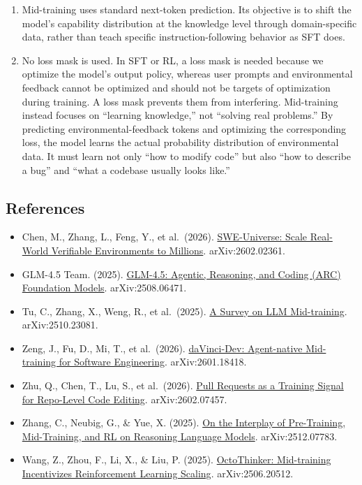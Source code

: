 \begin{enumerate}
\def\labelenumi{\arabic{enumi}.}
\item
  Mid-training uses standard next-token prediction. Its objective is to shift the model's capability distribution at the knowledge level through domain-specific data, rather than teach specific instruction-following behavior as SFT does.
\item
  No loss mask is used. In SFT or RL, a loss mask is needed because we optimize the model's output policy, whereas user prompts and environmental feedback cannot be optimized and should not be targets of optimization during training. A loss mask prevents them from interfering. Mid-training instead focuses on ``learning knowledge,'' not ``solving real problems.'' By predicting environmental-feedback tokens and optimizing the corresponding loss, the model learns the actual probability distribution of environmental data. It must learn not only ``how to modify code'' but also ``how to describe a bug'' and ``what a codebase usually looks like.''
\end{enumerate}

\FloatBarrier
{}
\hypertarget{references-117}{%
\subsection{References}\label{references-117}}

\vspace{0.25em}
\begin{itemize}
\tightlist
\item
  Chen, M., Zhang, L., Feng, Y., et al.~(2026). \href{https://arxiv.org/abs/2602.02361}{SWE-Universe: Scale Real-World Verifiable Environments to Millions}. arXiv:2602.02361.
\item
  GLM-4.5 Team. (2025). \href{https://arxiv.org/abs/2508.06471}{GLM-4.5: Agentic, Reasoning, and Coding (ARC) Foundation Models}. arXiv:2508.06471.
\item
  Tu, C., Zhang, X., Weng, R., et al.~(2025). \href{https://arxiv.org/abs/2510.23081}{A Survey on LLM Mid-training}. arXiv:2510.23081.
\item
  Zeng, J., Fu, D., Mi, T., et al.~(2026). \href{https://arxiv.org/abs/2601.18418}{daVinci-Dev: Agent-native Mid-training for Software Engineering}. arXiv:2601.18418.
\item
  Zhu, Q., Chen, T., Lu, S., et al.~(2026). \href{https://arxiv.org/abs/2602.07457}{Pull Requests as a Training Signal for Repo-Level Code Editing}. arXiv:2602.07457.
\item
  Zhang, C., Neubig, G., \& Yue, X. (2025). \href{https://arxiv.org/abs/2512.07783}{On the Interplay of Pre-Training, Mid-Training, and RL on Reasoning Language Models}. arXiv:2512.07783.
\item
  Wang, Z., Zhou, F., Li, X., \& Liu, P. (2025). \href{https://arxiv.org/abs/2506.20512}{OctoThinker: Mid-training Incentivizes Reinforcement Learning Scaling}. arXiv:2506.20512.
\end{itemize}

\clearpage
